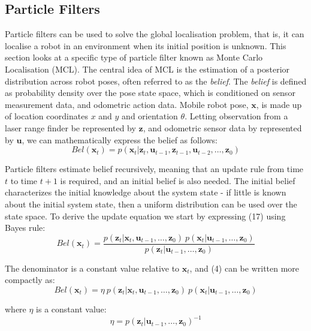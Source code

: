 \documentclass[a4paper]{article}
\begin{document}
\pagebreak

\subsection{Particle Filters}
Particle filters can be used to solve the global localisation problem, that is, it can localise a robot in an environment when its initial position is unknown. This section looks at a specific type of particle filter known as Monte Carlo Localisation (MCL). The central idea of MCL is the estimation of a posterior distribution across robot poses, often referred to as the \textit{belief}. The \textit{belief} is defined as probability density over the pose state space, which is conditioned on sensor measurement data, and odometric action data. Mobile robot pose, $\mathbf{x}$, is made up of location coordinates $x$ and $y$ and orientation $\theta$. Letting observation from a laser range finder be represented by $\mathbf{z}$, and odometric sensor data by represented by $\mathbf{u}$, we can mathematically express the belief as follows:
\begin{equation}
Bel(\mathbf{x}_t) = p(\mathbf{x}_t | \mathbf{z}_t, \mathbf{u}_{t-1}, \mathbf{z}_{t-1}, \mathbf{u}_{t-2},\ldots,\mathbf{z}_0)
\end{equation}

Particle filters estimate belief recursively, meaning that an update rule from time $t$ to time $t+1$ is required, and an initial belief is also needed. The initial belief characterizes the initial knowledge about the system state - if little is known about the initial system state, then a uniform distribution can be used over the state space. To derive the update equation we start by expressing (17) using Bayes rule:
\begin{equation}
Bel(\mathbf{x}_t) = \frac{p(\mathbf{z}_t | \mathbf{x}_t,\mathbf{u}_{t-1},\ldots,\mathbf{z}_0) \ p(\mathbf{x}_t | \mathbf{u}_{t-1},\ldots,\mathbf{z}_0)}{p(\mathbf{z}_t | \mathbf{u}_{t-1},\ldots,\mathbf{z}_0)}
\end{equation}

The denominator is a constant value relative to $\mathbf{x}_t$, and (4) can be written more compactly as:
\begin{equation}
Bel(\mathbf{x}_t) = \eta \ p(\mathbf{z}_t | \mathbf{x}_t,\mathbf{u}_{t-1},\ldots,\mathbf{z}_0) \ p(\mathbf{x}_t | \mathbf{u}_{t-1},\ldots,\mathbf{z}_0)
\end{equation}

where $\eta$ is a constant value:
\begin{equation}
\eta = p(\mathbf{z}_t | \mathbf{u}_{t-1},\ldots,\mathbf{z}_0)^{-1}
\end{equation}
\end{document}
